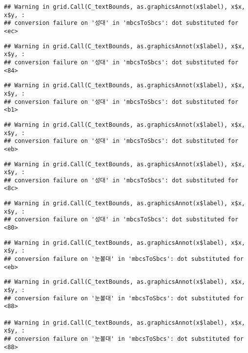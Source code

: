 \documentclass[
]{article}
\begin{document}
\begin{verbatim}
## Warning in grid.Call(C_textBounds, as.graphicsAnnot(x$label), x$x, x$y, :
## conversion failure on '성대' in 'mbcsToSbcs': dot substituted for <ec>
\end{verbatim}

\begin{verbatim}
## Warning in grid.Call(C_textBounds, as.graphicsAnnot(x$label), x$x, x$y, :
## conversion failure on '성대' in 'mbcsToSbcs': dot substituted for <84>
\end{verbatim}

\begin{verbatim}
## Warning in grid.Call(C_textBounds, as.graphicsAnnot(x$label), x$x, x$y, :
## conversion failure on '성대' in 'mbcsToSbcs': dot substituted for <b1>
\end{verbatim}

\begin{verbatim}
## Warning in grid.Call(C_textBounds, as.graphicsAnnot(x$label), x$x, x$y, :
## conversion failure on '성대' in 'mbcsToSbcs': dot substituted for <eb>
\end{verbatim}

\begin{verbatim}
## Warning in grid.Call(C_textBounds, as.graphicsAnnot(x$label), x$x, x$y, :
## conversion failure on '성대' in 'mbcsToSbcs': dot substituted for <8c>
\end{verbatim}

\begin{verbatim}
## Warning in grid.Call(C_textBounds, as.graphicsAnnot(x$label), x$x, x$y, :
## conversion failure on '성대' in 'mbcsToSbcs': dot substituted for <80>
\end{verbatim}

\begin{verbatim}
## Warning in grid.Call(C_textBounds, as.graphicsAnnot(x$label), x$x, x$y, :
## conversion failure on '눈볼대' in 'mbcsToSbcs': dot substituted for <eb>
\end{verbatim}

\begin{verbatim}
## Warning in grid.Call(C_textBounds, as.graphicsAnnot(x$label), x$x, x$y, :
## conversion failure on '눈볼대' in 'mbcsToSbcs': dot substituted for <88>

## Warning in grid.Call(C_textBounds, as.graphicsAnnot(x$label), x$x, x$y, :
## conversion failure on '눈볼대' in 'mbcsToSbcs': dot substituted for <88>
\end{verbatim}
\end{document}
